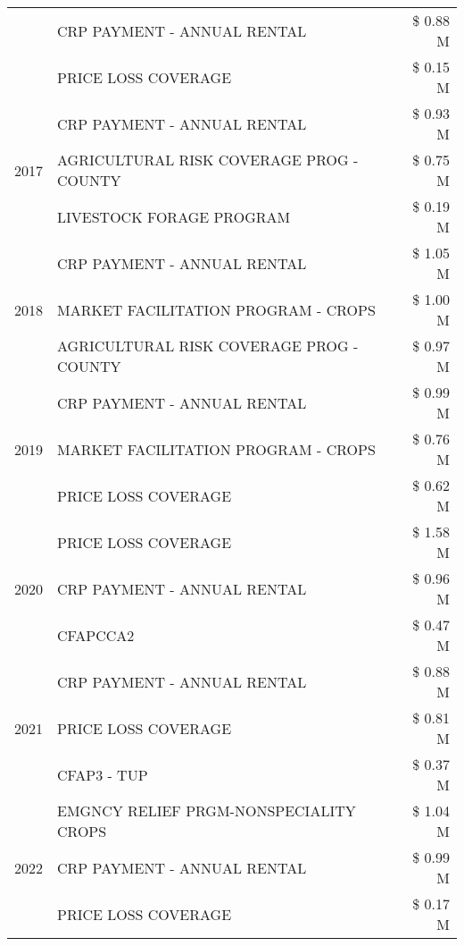 \begin{tabular}{llr}
 & CRP PAYMENT - ANNUAL RENTAL & \$ 0.88 M \\
 & PRICE LOSS COVERAGE & \$ 0.15 M \\
\cline{1-3}
\multirow[t]{3}{*}{2017} & CRP PAYMENT - ANNUAL RENTAL & \$ 0.93 M \\
 & AGRICULTURAL RISK COVERAGE PROG - COUNTY & \$ 0.75 M \\
 & LIVESTOCK FORAGE PROGRAM & \$ 0.19 M \\
\cline{1-3}
\multirow[t]{3}{*}{2018} & CRP PAYMENT - ANNUAL RENTAL & \$ 1.05 M \\
 & MARKET FACILITATION PROGRAM - CROPS & \$ 1.00 M \\
 & AGRICULTURAL RISK COVERAGE PROG - COUNTY & \$ 0.97 M \\
\cline{1-3}
\multirow[t]{3}{*}{2019} & CRP PAYMENT - ANNUAL RENTAL & \$ 0.99 M \\
 & MARKET FACILITATION PROGRAM - CROPS & \$ 0.76 M \\
 & PRICE LOSS COVERAGE & \$ 0.62 M \\
\cline{1-3}
\multirow[t]{3}{*}{2020} & PRICE LOSS COVERAGE & \$ 1.58 M \\
 & CRP PAYMENT - ANNUAL RENTAL & \$ 0.96 M \\
 & CFAPCCA2 & \$ 0.47 M \\
\cline{1-3}
\multirow[t]{3}{*}{2021} & CRP PAYMENT - ANNUAL RENTAL & \$ 0.88 M \\
 & PRICE LOSS COVERAGE & \$ 0.81 M \\
 & CFAP3 - TUP & \$ 0.37 M \\
\cline{1-3}
\multirow[t]{3}{*}{2022} & EMGNCY RELIEF PRGM-NONSPECIALITY CROPS & \$ 1.04 M \\
 & CRP PAYMENT - ANNUAL RENTAL & \$ 0.99 M \\
 & PRICE LOSS COVERAGE & \$ 0.17 M \\
\cline{1-3}
\bottomrule
\end{tabular}
